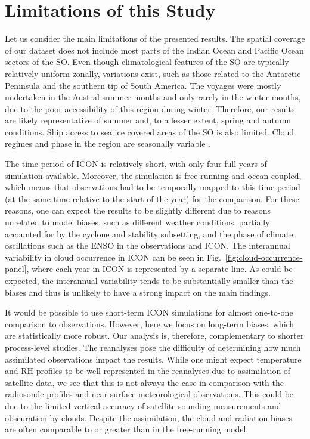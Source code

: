 \documentclass[draft]{agujournal2019}
\begin{document}
\section{Limitations of this Study}
\label{sec:limitations}

Let us consider the main limitations of the presented results. The spatial coverage of our dataset does not include most parts of the Indian Ocean and Pacific Ocean sectors of the SO. Even though climatological features of the SO are typically relatively uniform zonally, variations exist, such as those related to the Antarctic Peninsula and the southern tip of South America. The voyages were mostly undertaken in the Austral summer months and only rarely in the winter months, due to the poor accessibility of this region during winter. Therefore, our results are likely representative of summer and, to a lesser extent, spring and autumn conditions. Ship access to sea ice covered areas of the SO is also limited. Cloud regimes and phase in the region are seasonally variable \cite{danker2022}.

The time period of ICON is relatively short, with only four full years of simulation available. Moreover, the simulation is free-running and ocean-coupled, which means that observations had to be temporally mapped to this time period (at the same time relative to the start of the year) for the comparison. For these reasons, one can expect the results to be slightly different due to reasons unrelated to model biases, such as different weather conditions, partially accounted for by the cyclone and stability subsetting, and the phase of climate oscillations such as the ENSO in the observations and ICON. The interannual variability in cloud occurrence in ICON can be seen in Fig.~\ref{fig:cloud-occurrence-panel}, where each year in ICON is represented by a separate line. As could be expected, the interannual variability tends to be substantially smaller than the biases and thus is unlikely to have a strong impact on the main findings.

It would be possible to use short-term ICON simulations for almost one-to-one comparison to observations. However, here we focus on long-term biases, which are statistically more robust. Our analysis is, therefore, complementary to shorter process-level studies. The reanalyses pose the difficulty of determining how much assimilated observations impact the results. While one might expect temperature and RH profiles to be well represented in the reanalyses due to assimilation of satellite data, we see that this is not always the case in comparison with the radiosonde profiles and near-surface meteorological observations. This could be due to the limited vertical accuracy of satellite sounding measurements and obscuration by clouds. Despite the assimilation, the cloud and radiation biases are often comparable to or greater than in the free-running model.
\end{document}
